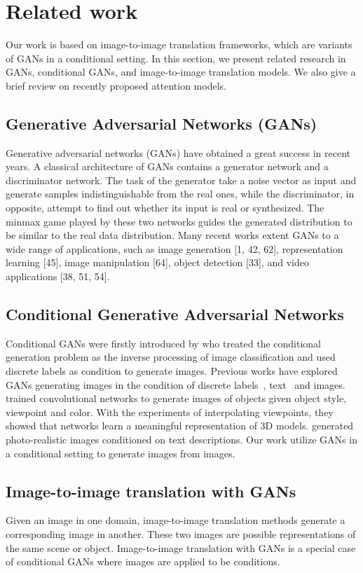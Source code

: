 \section{Related work}
Our work is based on image-to-image translation frameworks, which are variants of GANs in a conditional setting. In this section, we present related research in GANs, conditional GANs, and image-to-image translation models. We also give a brief review on recently proposed attention models.
\subsection{Generative Adversarial Networks (GANs)}
Generative adversarial networks (GANs) \cite{GANs} have obtained a great success in recent years.
A classical architecture of GANs contains a generator network and a discriminator network. The task of the generator take a noise vector as input and generate samples indistinguishable from the real ones, while the discriminator, in opposite, attempt to find out whether its input is real or synthesized. The minmax game played by these two networks guides the generated distribution to be similar to the real data distribution. 
%
Many recent works extent GANs to a wide range of applications, such as image generation [1, 42, 62], representation learning [45], image manipulation [64], object detection [33], and video applications [38, 51, 54]. 

\subsection{Conditional Generative Adversarial Networks}
Conditional GANs were firstly introduced by \cite{CGAN} who treated the conditional generation problem as the inverse processing of image classification and used discrete labels as condition to generate images. Previous works have explored GANs generating images in the condition of discrete labels~\cite{CGAN}, text~\cite{Reed2016} and images.
%
\cite{Dosovitskiy2014} trained convolutional networks to generate images of objects given object style, viewpoint and color. With the experiments of interpolating viewpoints, they showed that networks learn a meaningful representation of 3D models. 
%
\cite{Reed2016} generated photo-realistic images conditioned on text descriptions. 
%
Our work utilize GANs in a conditional setting to generate images from images.


\subsection{Image-to-image translation with GANs}
Given an image in one domain, image-to-image translation methods generate a corresponding image in another. These two images are possible representations of the same scene or object. Image-to-image translation with GANs is a special case of conditional GANs where images are applied to be conditions. 
%


